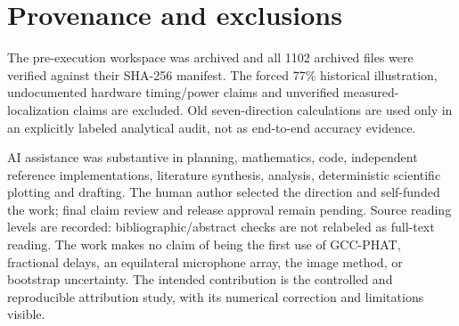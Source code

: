 \documentclass[10pt,a4paper]{article}
\begin{document}
\section{Provenance and exclusions}
The pre-execution workspace was archived and all 1102 archived files were verified against their SHA-256 manifest. The forced 77\% historical illustration, undocumented hardware timing/power claims and unverified measured-localization claims are excluded. Old seven-direction calculations are used only in an explicitly labeled analytical audit, not as end-to-end accuracy evidence.

AI assistance was substantive in planning, mathematics, code, independent reference implementations, literature synthesis, analysis, deterministic scientific plotting and drafting. The human author selected the direction and self-funded the work; final claim review and release approval remain pending. Source reading levels are recorded: bibliographic/abstract checks are not relabeled as full-text reading. The work makes no claim of being the first use of GCC-PHAT, fractional delays, an equilateral microphone array, the image method, or bootstrap uncertainty. The intended contribution is the controlled and reproducible attribution study, with its numerical correction and limitations visible.
\end{document}
